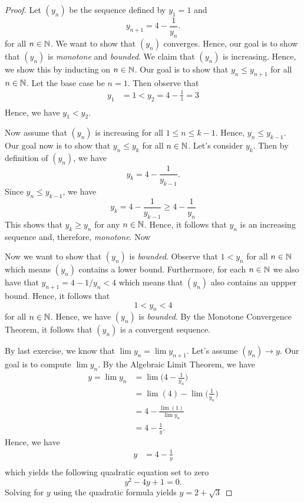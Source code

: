 \begin{proof}
Let \( (y_n)\) be the sequence defined by \( y_1 = 1 \) and 
\[
    y_{n+1} = 4 - \frac{1}{y_n}.
\] for all \( n \in \mathbb{N} \). 
We want to show that \( (y_n)\) converges. Hence, our goal is to show that \( (y_n)\) is \textit{monotone} and \textit{bounded}. We claim that \( (y_n)\) is increasing. Hence, we show this by inducting on \( n \in \mathbb{N} \). Our goal is to show that \( y_n \leq y_{n+1}\) for all \( n \in \mathbb{N} \). Let the base case be \( n = 1 \). Then observe that 
\begin{align*}
 y_1 &= 1 < y_2 = 4 - \frac{1}{1} = 3  \\ 
\end{align*}
Hence, we have \( y_1 < y_2\). 

Now assume that \( (y_n)\) is increasing for all \( 1 \leq n \leq k - 1\). Hence, \( y_n \leq y_{k-1}\). Our goal now is to show that \( y_n \leq y_k\) for all \( n \in \mathbb{N} \). Let's consider \( y_k\). Then by definition of \( (y_n)\), we have 
\[
    y_k = 4 - \frac{1}{y_{k-1}}.
\]
Since \( y_n \leq y_{k-1}\), we have 
\[
y_k = 4 - \frac{1}{y_{k-1}} \geq 4 - \frac{1}{y_{n}}
\]
This shows that \( y_{k} \geq y_n \) for any \( n \in \mathbb{N} \). Hence, it follows that \( y_{n}\) is an increasing sequence and, therefore, \textit{monotone}. Now

Now we want to show that \( (y_n)\) is \textit{bounded}. Observe that \( 1 < y_n \) for all \(n \in \mathbb{N} \) which means \( (y_n)\) contains a lower bound. Furthermore, for each \(n \in \mathbb{N}\) we also have that \( y_{n+1} = 4 - 1/y_n < 4\) which means that \( (y_n)\) also contains an uppper bound. Hence, it follows that 
\[
1 < y_n < 4
\]
for all \( n \in \mathbb{N} \). Hence, we have \( (y_n)\) is \textit{bounded}. By the Monotone Convergence Theorem, it follows that \( (y_n)\) is a convergent sequence. 

By last exercise, we know that \( \lim y_n = \lim y_{n+1}  \). Let's assume \( (y_n) \to y \). Our goal is to compute \( \lim y_n \). By the Algebraic Limit Theorem, we have 
\begin{align*}
    y = \lim y_n &= \lim \Big( 4 - \frac{1}{y_n}\Big)  \\ 
                 &= \lim (4) - \lim \Big( \frac{1}{y_n}\Big) \\
                 &= 4 - \frac{ \lim(1) }{ \lim y_n } \\
                 &= 4 - \frac{1}{y}.
\end{align*}
Hence, we have 
\begin{align*}
y &= 4 - \frac{1}{y} \\ 
\end{align*}
which yields the following quadratic equation set to zero
\[
y^2 -4y + 1 = 0. 
\]
Solving for \( y \) using the quadratic formula yields \( y = 2 + \sqrt{3}\)
\end{proof}

